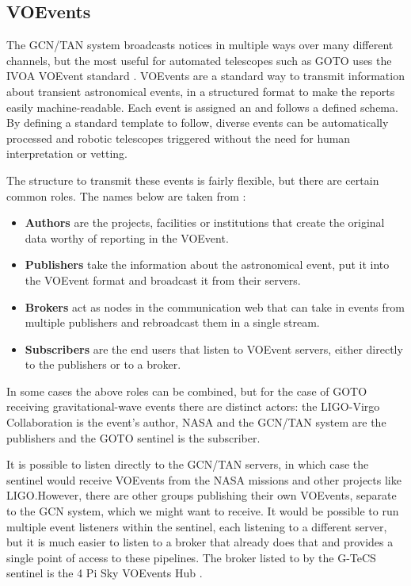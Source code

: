 \subsection{VOEvents}
\label{sec:voevents}
\begin{colsection}

The GCN/TAN system broadcasts notices in multiple ways over many different channels, but the most useful for automated telescopes such as GOTO uses the IVOA VOEvent standard \citep{voevent}. VOEvents are a standard way to transmit information about transient astronomical events, in a structured format to make the reports easily machine-readable. Each event is assigned an  and follows a defined schema. By defining a standard template to follow, diverse events can be automatically processed and robotic telescopes triggered without the need for human interpretation or vetting.

The structure to transmit these events is fairly flexible, but there are certain common roles. The names below are taken from \citet{voevent}:

\begin{itemize}
    \item \textbf{Authors} are the projects, facilities or institutions that create the original data worthy of reporting in the VOEvent.
    \item \textbf{Publishers} take the information about the astronomical event, put it into the VOEvent format and broadcast it from their servers.
    \item \textbf{Brokers} act as nodes in the communication web that can take in events from multiple publishers and rebroadcast them in a single stream.
    \item \textbf{Subscribers} are the end users that listen to VOEvent servers, either directly to the publishers or to a broker.
\end{itemize}

In some cases the above roles can be combined, but for the case of GOTO receiving gravitational-wave events there are distinct actors: the LIGO-Virgo Collaboration is the event's author, NASA and the GCN/TAN system are the publishers and the GOTO sentinel is the subscriber.

It is possible to listen directly to the GCN/TAN servers, in which case the sentinel would receive VOEvents from the NASA missions and other projects like LIGO.\@ However, there are other groups publishing their own VOEvents, separate to the GCN system, which we might want to receive. It would be possible to run multiple event listeners within the sentinel, each listening to a different server, but it is much easier to listen to a broker that already does that and provides a single point of access to these pipelines. The broker listed to by the G-TeCS sentinel is the 4 Pi Sky VOEvents Hub \citep{4pisky}.


\end{colsection}
